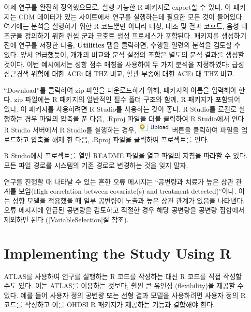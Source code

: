 \documentclass[11pt]{book}
\theoremstyle{definition}
\theoremstyle{definition}
\theoremstyle{definition}
\theoremstyle{remark}
\begin{document}
이제 연구를 완전히 정의했으므로, 실행 가능한 R 패키지로 export할 수
있다. 이 패키지는 CDM 데이터가 있는 사이트에서 연구를 실행하는데 필요한
모든 것이 들어있다. 여기에는 분석을 실행하기 위한 R 코드뿐만 아니라
대상, 대조 및 결과 코호트, 음성 대조군을 정의하기 위한 컨셉 군과 코호트
생성 프로세스가 포함된다. 패키지를 생성하기 전에 연구를 저장한 다음,
\textbf{Utilities} 탭을 클릭하면, 수행될 일련의 분석을 검토할 수 있다.
앞서 언급했듯이, 개개의 비교와 분석 설정의 조합은 별도의 분석 결과를
생성할 것이다. 이번 예시에서는 성향 점수 매칭을 사용하여 두 가지 분석을
지정하였다: 급성심근경색 위험에 대한 ACEi 대 THZ 비교, 혈관 부종에 대한
ACEi 대 THZ 비교.

``Download''를 클릭하여 zip 파일을 다운로드하기 위해, 패키지의 이름을
입력해야 한다. zip 파일에는 R 패키지의 일반적인 필수 폴더 구조와 함께, R
패키지가 포함되어 있다. \citep{Wickham_2015} 이 패키지를 사용하려면 R
Studio를 사용하는 것이 좋다. R Studio를 로컬로 실행하는 경우 파일의
압축을 푼 다음, .Rproj 파일을 더블 클릭하여 R Studio에서 연다. R Studio
서버에서 R Studio를 실행하는 경우,
\includegraphics{images/PopulationLevelEstimation/upload.png} 버튼을
클릭하여 파일을 업로드하고 압축을 해제 한 다음, .Rproj 파일을 클릭하여
프로젝트를 연다.

R Studio에서 프로젝트를 열면 README 파일을 열고 파일의 지침을 따라할 수
있다. 모든 파일 경로를 시스템의 기존 경로로 변경하는 것을 잊지 말자.

연구를 진행할 때 나타날 수 있는 흔한 오류 메시지는 ``공변량과 치료가
높은 상관 관계를 보임(High correlation between covariate(s) and
treatment detected)''이다. 이는 성향 모델을 적용했을 때 일부 공변량이
노출과 높은 상관 관계가 있음을 나타낸다. 오류 메시지에 언급된 공변량을
검토하고 적절한 경우 해당 공변량을 공변량 집합에서 제외하면 된다
(\ref{VariableSelection}절 참조). 

\section{Implementing the Study Using R}\label{pleR}

ATLAS를 사용하여 연구를 실행하는 R 코드를 작성하는 대신 R 코드를 직접
작성할 수도 있다. 이는 ATLAS를 이용하는 것보다, 훨씬 큰 유연성
(flexibility)을 제공할 수 있다. 예를 들어 사용자 정의 공변량 또는 선형
결과 모델을 사용하려면 사용자 정의 R 코드를 작성하고 이를 OHDSI R
패키지가 제공하는 기능과 결합해야 한다.
\end{document}
